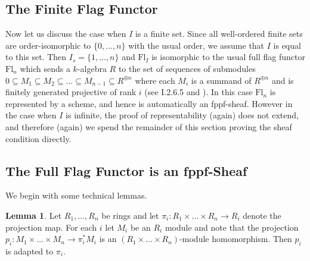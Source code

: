 \documentclass[oneside,11pt]{amsart}
\newcommand{\Fl}{\ensuremath{\text{Fl}}}
\theoremstyle{definition}
\newtheorem{proof techniques}{Proof Techniques}
\newtheorem{lemma}{Lemma}
\begin{document}
\subsection{The Finite Flag Functor}
Now let us discuss the case when $I$ is a finite set. Since all well-ordered finite sets are order-isomorphic to $\{0 , \ldots ,n\}$ with the usual order, we assume that $I$ is equal to this set. Then $I_s = \{ 1,\ldots, n\}$ and $\Fl_I$ is isomorphic to the usual full flag functor $\Fl_n$ which sends a $k$-algebra $R$ to the set of sequences of submodules $0 \subseteq M_1 \subseteq M_2 \subseteq \ldots \subseteq M_{n - 1} \subseteq R^{\oplus n}$ where each $M_i$ is a summand of $R^{\oplus n}$ and is finitely generated projective of rank $i$ (see \cite{demazure-gabriel1980} I.2.6.5 and \cite{karpenko2000}). In this case $\Fl_n$ is represented by a scheme, and hence is automatically an fppf-sheaf. However in the case when $I$ is infinite, the proof of representability (again) does not extend, and therefore (again) we spend the remainder of this section proving the sheaf condition directly. 



\subsection{The Full Flag Functor is an fppf-Sheaf}
We begin with some technical lemmas. 

\begin{lemma}\label{lem: change of rings and products}
Let $R_1,\ldots, R_n$ be rings and let $\pi_i : R_1 \times \ldots \times R_n \to R_i$ denote the projection map. For each $i$ let $M_i$ be an $R_i$ module and note that the projection $p_i : M_1 \times \ldots \times M_n \to \pi_i^* M_i$ is an $(R_1 \times \ldots \times R_n)$-module homomorphism. Then $p_i$ is adapted to $\pi_i$. 
\end{lemma}
\end{document}
